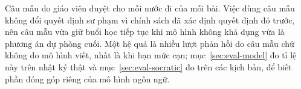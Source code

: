 Câu mẫu do giáo viên duyệt cho mỗi nước đi của mỗi bài. Việc dùng câu mẫu không đổi quyết định sư phạm vì chính sách đã xác định quyết định đó trước, nên câu mẫu vừa giữ buổi học tiếp tục khi mô hình không khả dụng vừa là phương án dự phòng cuối. Một hệ quả là nhiều lượt phản hồi do câu mẫu chứ không do mô hình viết, nhất là khi hạn mức cạn; mục~\ref{sec:eval-model} đo tỉ lệ này trên nhật ký thật và mục~\ref{sec:eval-socratic} đo trên các kịch bản, để biết phần đóng góp riêng của mô hình ngôn ngữ.
